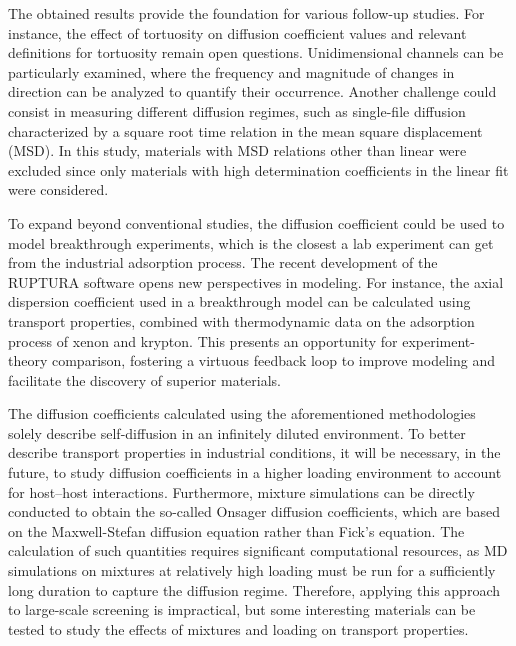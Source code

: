 \documentclass[main]{subfiles}
\begin{document}
The obtained results provide the foundation for various follow-up studies. For instance, the effect of tortuosity on diffusion coefficient values and relevant definitions for tortuosity remain open questions. Unidimensional channels can be particularly examined, where the frequency and magnitude of changes in direction can be analyzed to quantify their occurrence\autocite{Bullitt_2003}. Another challenge could consist in measuring different diffusion regimes, such as single-file diffusion characterized by a square root time relation in the mean square displacement (MSD)\autocite{Lin_2005}. In this study, materials with MSD relations other than linear were excluded since only materials with high determination coefficients in the linear fit were considered.

To expand beyond conventional studies, the diffusion coefficient could be used to model breakthrough experiments, which is the closest a lab experiment can get from the industrial adsorption process. The recent development of the RUPTURA software\autocite{Sharma_2023} opens new perspectives in modeling. For instance, the axial dispersion coefficient used in a breakthrough model can be calculated using transport properties, combined with thermodynamic data on the adsorption process of xenon and krypton. This presents an opportunity for experiment-theory comparison, fostering a virtuous feedback loop to improve modeling and facilitate the discovery of superior materials.

The diffusion coefficients calculated using the aforementioned methodologies solely describe self-diffusion in an infinitely diluted environment. To better describe transport properties in industrial conditions, it will be necessary, in the future, to study diffusion coefficients in a higher loading environment to account for host--host interactions. Furthermore, mixture simulations can be directly conducted to obtain the so-called Onsager diffusion coefficients, which are based on the Maxwell-Stefan diffusion equation rather than Fick's equation.\autocite{Krishna_2008} The calculation of such quantities requires significant computational resources, as MD simulations on mixtures at relatively high loading must be run for a sufficiently long duration to capture the diffusion regime. Therefore, applying this approach to large-scale screening is impractical, but some interesting materials can be tested to study the effects of mixtures and loading on transport properties.

\begin{center}
\end{center}
\end{document}

